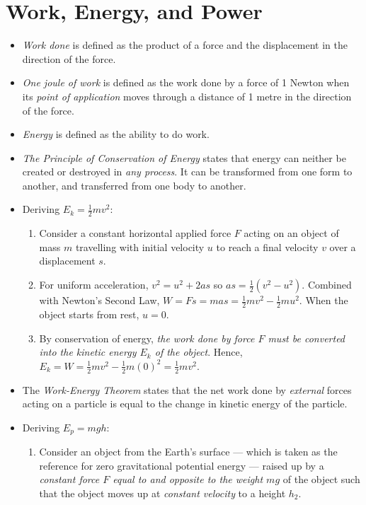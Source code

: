 \documentclass[oneside]{book}
\begin{document}
\chapter{Work, Energy, and Power}
\begin{itemize}
    \item \emph{Work done} is defined as the product of a force and the displacement in the direction of the force.
    \item \emph{One joule of work} is defined as the work done by a force of 1 Newton when its \emph{point of application} moves through a distance of 1 metre in the direction of the force.
    \item \emph{Energy} is defined as the ability to do work.
    \item \emph{The Principle of Conservation of Energy} states that energy can neither be created or destroyed in \emph{any process}. It can be transformed from one form to another, and transferred from one body to another.
    \item Deriving \(E_k=\frac{1}{2}mv^2\): 
    \begin{enumerate}
        \item Consider a constant horizontal applied force \(F\) acting on an object of mass \(m\) travelling with initial velocity \(u\) to reach a final velocity \(v\) over a displacement \(s\). 
        \item For uniform acceleration, \(v^2=u^2+2as\) so \(as=\frac{1}{2}(v^2-u^2)\). Combined with Newton's Second Law, \(W=Fs=mas=\frac{1}{2}mv^2-\frac{1}{2}mu^2\). When the object starts from rest, \(u=0\). 
        \item By conservation of energy,\emph{ the work done by force \(F\) must be converted into the kinetic energy \(E_k\) of the object}. Hence, \(E_k=W=\frac{1}{2}mv^2-\frac{1}{2}m(0)^2=\frac{1}{2}mv^2\).
    \end{enumerate}
    \item The \emph{Work-Energy Theorem} states that the net work done by \emph{external} forces acting on a particle is equal to the change in kinetic energy of the particle.
    \item Deriving \(E_p=mgh\):
    \begin{enumerate}
        \item Consider an object from the Earth's surface --- which is taken as the reference for zero gravitational potential energy --- raised up by a \emph{constant force \(F\) equal to and opposite to the weight \(mg\)} of the object such that the object moves up at \emph{constant velocity} to a height \(h_2\). 

\end{enumerate}
\end{itemize}
\end{document}
